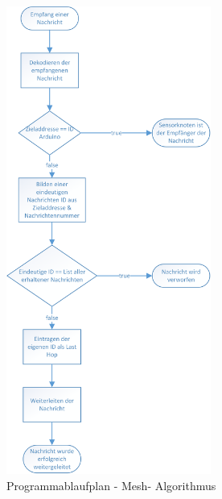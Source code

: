 \begin{figure}
	\centering
	\includegraphics[width=0.6\textwidth]{bilder/PAPMesh.png}
	\caption{Programmablaufplan - Mesh- Algorithmus}
	\label{img:PAPMeshAlgo}
\end{figure}
